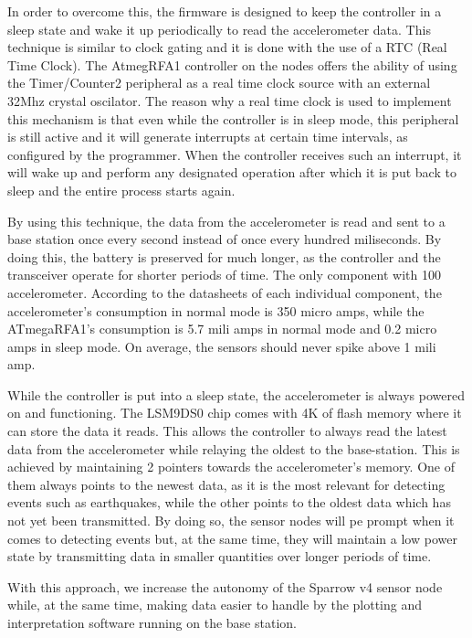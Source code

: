 In order to overcome this, the firmware is designed to keep the controller in a sleep state and wake it up periodically to read the accelerometer data. 
This technique is similar to clock gating and it is done with the use of a RTC (Real Time Clock). The AtmegRFA1 controller on the nodes offers the ability of using the Timer/Counter2 
peripheral as a real time clock source with an external 32Mhz crystal oscilator. The reason why a real time clock is used to implement this mechanism is that even while the controller 
is in sleep mode, this peripheral is still active and it will generate interrupts at certain time intervals, as configured by the programmer. When the controller receives such an 
interrupt, it will wake up and perform any designated operation after which it is put back to sleep and the entire process starts again.

By using this technique, the data from the accelerometer is read and sent to a base station once every second instead of once every hundred miliseconds. By doing this, 
the battery is preserved for much longer, as the controller and the transceiver operate for shorter periods of time. The only component with 100%
accelerometer. According to the datasheets of each individual component, the accelerometer's consumption in normal mode is 350 micro amps, while the ATmegaRFA1's consumption is
5.7 mili amps in normal mode and 0.2 micro amps in sleep mode. On average, the sensors should never spike above 1 mili amp. 

While the controller is put into a sleep state, the accelerometer is always powered on and functioning. The LSM9DS0 chip comes with 4K of flash memory where it can store the data 
it reads. This allows the controller to always read the latest data from the accelerometer while relaying the oldest to the base-station. This is achieved by maintaining 2 pointers 
towards the accelerometer's memory. One of them always points to the newest data, as it is the most relevant for detecting events such as earthquakes, while the other points to the 
oldest data which has not yet been transmitted. By doing so, the sensor nodes will pe prompt when it comes to detecting events but, at the same time, they will maintain a low power 
state by transmitting data in smaller quantities over longer periods of time.

With this approach, we increase the autonomy of the Sparrow v4 sensor node while, at the same time, making data easier to handle by the plotting and interpretation software running 
on the base station.
